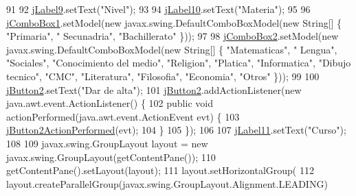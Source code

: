 \begin{DoxyCode}
91 
92         \mbox{\hyperlink{class_interfaz_package_1_1_alta_libro_texto_af230caad4def2d93c0ebd623faf2dd01}{jLabel9}}.setText(\textcolor{stringliteral}{"Nivel"});
93 
94         \mbox{\hyperlink{class_interfaz_package_1_1_alta_libro_texto_a7a931dd787f522e40bea361927d6bd1b}{jLabel10}}.setText(\textcolor{stringliteral}{"Materia"});
95 
96         \mbox{\hyperlink{class_interfaz_package_1_1_alta_libro_texto_a3413630b2b16f449c4ea9455da599211}{jComboBox1}}.setModel(\textcolor{keyword}{new} javax.swing.DefaultComboBoxModel(\textcolor{keyword}{new} String[] \{ \textcolor{stringliteral}{"Primaria"}, \textcolor{stringliteral}{"
      Secunadria"}, \textcolor{stringliteral}{"Bachillerato"} \}));
97 
98         \mbox{\hyperlink{class_interfaz_package_1_1_alta_libro_texto_a49e7ef058be95fcf124448e008bec61f}{jComboBox2}}.setModel(\textcolor{keyword}{new} javax.swing.DefaultComboBoxModel(\textcolor{keyword}{new} String[] \{ \textcolor{stringliteral}{"Matematicas"}, \textcolor{stringliteral}{"
      Lengua"}, \textcolor{stringliteral}{"Sociales"}, \textcolor{stringliteral}{"Conocimiento del medio"}, \textcolor{stringliteral}{"Religion"}, \textcolor{stringliteral}{"Platica"}, \textcolor{stringliteral}{"Informatica"}, \textcolor{stringliteral}{"Dibujo tecnico"}, \textcolor{stringliteral}{"CMC"},
       \textcolor{stringliteral}{"Literatura"}, \textcolor{stringliteral}{"Filosofia"}, \textcolor{stringliteral}{"Economia"}, \textcolor{stringliteral}{"Otros"} \}));
99 
100         \mbox{\hyperlink{class_interfaz_package_1_1_alta_libro_texto_a2a68befdaadc6870fcd31afa3214839b}{jButton2}}.setText(\textcolor{stringliteral}{"Dar de alta"});
101         \mbox{\hyperlink{class_interfaz_package_1_1_alta_libro_texto_a2a68befdaadc6870fcd31afa3214839b}{jButton2}}.addActionListener(\textcolor{keyword}{new} java.awt.event.ActionListener() \{
102             \textcolor{keyword}{public} \textcolor{keywordtype}{void} actionPerformed(java.awt.event.ActionEvent evt) \{
103                 \mbox{\hyperlink{class_interfaz_package_1_1_alta_libro_texto_a8bd7d882c4dbfeef021a5a80b6d5559b}{jButton2ActionPerformed}}(evt);
104             \}
105         \});
106 
107         \mbox{\hyperlink{class_interfaz_package_1_1_alta_libro_texto_a162463c516b899f292e7b5b96e2daeb2}{jLabel11}}.setText(\textcolor{stringliteral}{"Curso"});
108 
109         javax.swing.GroupLayout layout = \textcolor{keyword}{new} javax.swing.GroupLayout(getContentPane());
110         getContentPane().setLayout(layout);
111         layout.setHorizontalGroup(
112             layout.createParallelGroup(javax.swing.GroupLayout.Alignment.LEADING)

\end{DoxyCode}
